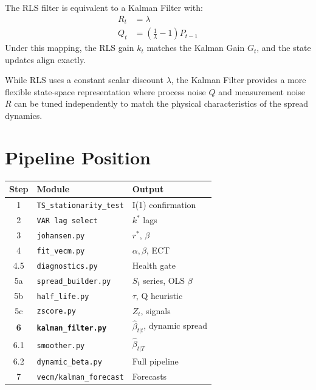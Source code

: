 \documentclass[10pt,a4paper,twocolumn]{article}
\begin{document}
\begin{tcolorbox}[mathbox={Kalman-RLS Equivalence}]
The RLS filter is equivalent to a Kalman Filter with:
\begin{align}
  R_t &= \lambda \\
  Q_t &= \left(\frac{1}{\lambda} - 1\right) P_{t-1}
\end{align}
Under this mapping, the RLS gain $k_t$ matches the Kalman Gain $G_t$, and the state updates align exactly.
\end{tcolorbox}
While RLS uses a constant scalar discount $\lambda$, the Kalman Filter provides a more flexible state-space representation where process noise $Q$ and measurement noise $R$ can be tuned independently to match the physical characteristics of the spread dynamics.

\section{Pipeline Position}

\begin{center}{\small
\begin{tabular}{@{}clp{2.5cm}@{}}
\toprule Step & Module & Output\\\midrule
1 & \texttt{TS\_stationarity\_test} & I(1) confirmation\\
2 & \texttt{VAR lag select} & $k^*$ lags\\
3 & \texttt{johansen.py} & $r^*$, $\beta$\\
4 & \texttt{fit\_vecm.py} & $\alpha, \beta$, ECT\\
4.5 & \texttt{diagnostics.py} & Health gate\\
5a & \texttt{spread\_builder.py} & $S_t$ series, OLS $\beta$\\
5b & \texttt{half\_life.py} & $\tau$, Q heuristic\\
5c & \texttt{zscore.py} & $Z_t$, signals\\
\textbf{6} & \textbf{\texttt{kalman\_filter.py}} & $\hat\beta_{t|t}$, dynamic spread\\
6.1 & \texttt{smoother.py} & $\hat\beta_{t|T}$\\
6.2 & \texttt{dynamic\_beta.py} & Full pipeline\\
7 & \texttt{vecm/kalman\_forecast} & Forecasts\\
\bottomrule
\end{tabular}
}\end{center}
\end{document}
